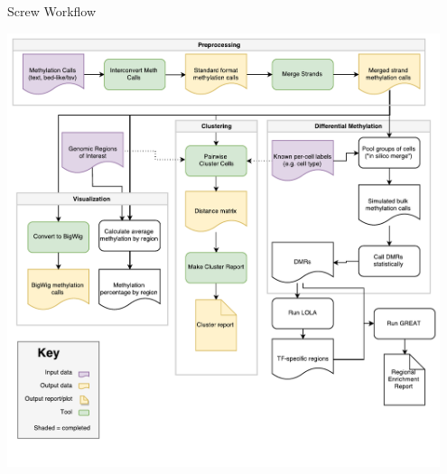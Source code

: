 \documentclass{beamer}
\begin{document}
\begin{frame}
\begin{columns}[t]
\begin{column}{.65\textwidth}
	\begin{block}{Screw Workflow}
	\begin{center}
  \includegraphics[width=0.95\textwidth]{figures/workflow_diagram.pdf}
  \end{center} 
  \end{block}
  \begin{columns}[t,totalwidth=\textwidth]


\begin{column}{.48\textwidth}
   


\end{column}
\end{columns}
\end{column}
\end{columns}
\end{frame}
\end{document}

